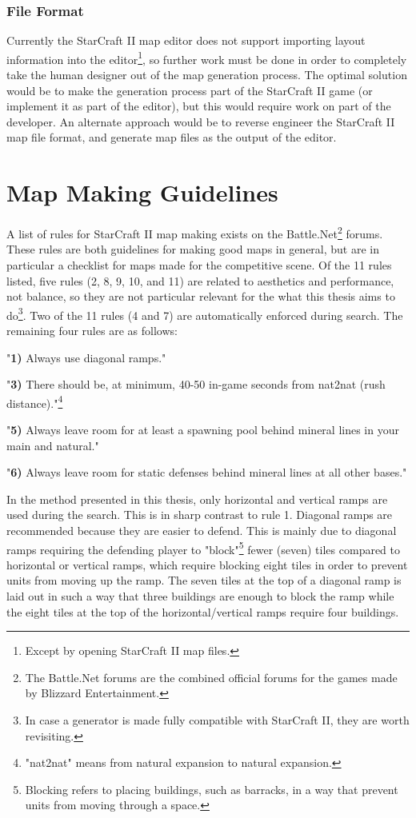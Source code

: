 \subsubsection{File Format}
Currently the StarCraft II map editor does not support importing layout information into the editor\footnote{Except by opening StarCraft II map files.}, so further work must be done in order to completely take the human designer out of the map generation process. The optimal solution would be to make the generation process part of the StarCraft II game (or implement it as part of the editor), but this would require work on part of the developer. An alternate approach would be to reverse engineer the StarCraft II map file format, and generate map files as the output of the editor.

\section{Map Making Guidelines}
\label{futurework_guidelines}
A list of rules for StarCraft II map making exists on the Battle.Net\footnote{The Battle.Net forums are the combined official forums for the games made by Blizzard Entertainment.} forums\cite{blizzardrulesmapmaking}. These rules are both guidelines for making good maps in general, but are in particular a checklist for maps made for the competitive scene. Of the 11 rules listed, five rules (2, 8, 9, 10, and 11) are related to aesthetics and performance, not balance, so they are not particular relevant for the what this thesis aims to do\footnote{In case a generator is made fully compatible with StarCraft II, they are worth revisiting.}. Two of the 11 rules (4 and 7) are automatically enforced during search. The remaining four rules are as follows:

\begin{my_itemize}
\item "\textbf{1)} Always use diagonal ramps."
\item "\textbf{3)} There should be, at minimum, 40-50 in-game seconds from nat2nat (rush distance)."\footnote{"nat2nat" means from natural expansion to natural expansion.}
\item "\textbf{5)} Always leave room for at least a spawning pool behind mineral lines in your main and natural."
\item "\textbf{6)} Always leave room for static defenses behind mineral lines at all other bases."
\end{my_itemize}

In the method presented in this thesis, only horizontal and vertical ramps are used during the search. This is in sharp contrast to rule 1. Diagonal ramps are recommended because they are easier to defend. This is mainly due to diagonal ramps requiring the defending player to "block"\footnote{Blocking refers to placing buildings, such as barracks, in a way that prevent units from moving through a space.} fewer (seven) tiles compared to horizontal or vertical ramps, which require blocking eight tiles in order to prevent units from moving up the ramp. The seven tiles at the top of a diagonal ramp is laid out in such a way that three buildings are enough to block the ramp while the eight tiles at the top of the horizontal/vertical ramps require four buildings.

